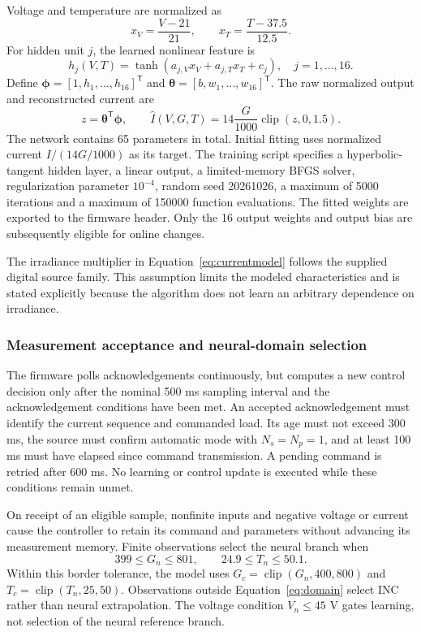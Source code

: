 \documentclass[Acad.Energy.,researcharticle,9pt,twoside,oneauthor]{Definitions/jams_academia}
\begin{document}
Voltage and temperature are normalized as
\begin{equation}
 x_V=\frac{V-21}{21},\qquad x_T=\frac{T-37.5}{12.5}.
\end{equation}
For hidden unit $j$, the learned nonlinear feature is
\begin{equation}
 h_j(V,T)=\tanh(a_{j,V}x_V+a_{j,T}x_T+c_j),
 \quad j=1,\ldots,16.
\end{equation}
Define $\symbf{\phi}=[1,h_1,\ldots,h_{16}]^{\mathsf T}$ and $\symbf{\theta}=[b,w_1,\ldots,w_{16}]^{\mathsf T}$. The raw normalized output and reconstructed current are
\begin{equation}
 z=\symbf{\theta}^{\mathsf T}\symbf{\phi},\qquad
 \widehat I(V,G,T)=14\frac{G}{1000}\operatorname{clip}(z,0,1.5).
 \label{eq:currentmodel}
\end{equation}
The network contains 65 parameters in total. Initial fitting uses normalized current $I/(14G/1000)$ as its target. The training script specifies a hyperbolic-tangent hidden layer, a linear output, a limited-memory BFGS solver, regularization parameter $10^{-4}$, random seed 20261026, a maximum of 5000 iterations and a maximum of 150000 function evaluations. The fitted weights are exported to the firmware header. Only the 16 output weights and output bias are subsequently eligible for online changes.

The irradiance multiplier in Equation~\ref{eq:currentmodel} follows the supplied digital source family. This assumption limits the modeled characteristics and is stated explicitly because the algorithm does not learn an arbitrary dependence on irradiance.

\subsubsection{Measurement acceptance and neural-domain selection}
The firmware polls acknowledgements continuously, but computes a new control decision only after the nominal 500 ms sampling interval and the acknowledgement conditions have been met. An accepted acknowledgement must identify the current sequence and commanded load. Its age must not exceed 300 ms, the source must confirm automatic mode with $N_s=N_p=1$, and at least 100 ms must have elapsed since command transmission. A pending command is retried after 600 ms. No learning or control update is executed while these conditions remain unmet.

On receipt of an eligible sample, nonfinite inputs and negative voltage or current cause the controller to retain its command and parameters without advancing its measurement memory. Finite observations select the neural branch when
\begin{equation}
 399\leq G_n\leq801,\qquad24.9\leq T_n\leq50.1.
 \label{eq:domain}
\end{equation}
Within this border tolerance, the model uses $G_c=\operatorname{clip}(G_n,400,800)$ and $T_c=\operatorname{clip}(T_n,25,50)$. Observations outside Equation~\ref{eq:domain} select INC rather than neural extrapolation. The voltage condition $V_n\leq45$ V gates learning, not selection of the neural reference branch.
\end{document}
